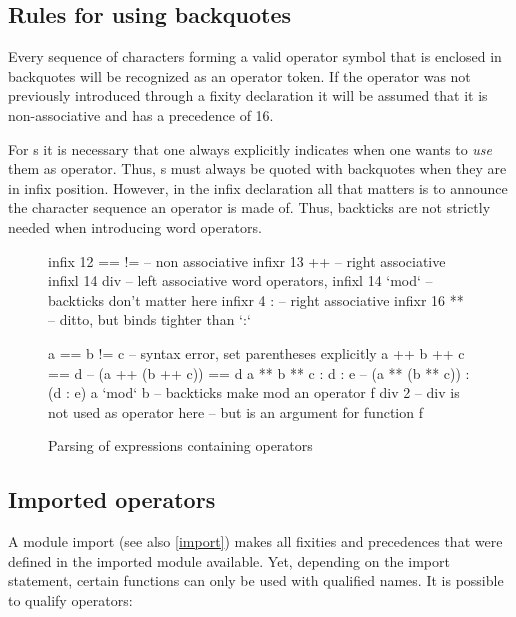 \subsection{Rules for using backquotes}

Every sequence of characters forming a valid operator symbol that is enclosed in backquotes will be recognized as an operator token. If the operator was not previously introduced through a fixity declaration it will be assumed that it is non-associative and has a precedence of 16.


For s it is necessary that one always explicitly indicates when one wants to \textit{use} them as operator. Thus, s must always be quoted with backquotes when they are in infix position. However, in the infix declaration all that matters is to announce the character sequence an operator is made of. Thus, backticks are not strictly needed when introducing word operators.

\begin{figure}

\begin{code}

infix 12 == !=           -- non associative
infixr 13 ++             -- right associative
infixl 14 div            -- left associative word operators, 
infixl 14 `mod`          -- backticks don't matter here
infixr 4 :               -- right associative
infixr 16 **             -- ditto, but binds tighter than `:`

a == b != c              -- syntax error, set parentheses explicitly
a ++ b ++ c  == d        -- (a ++ (b ++ c)) == d
a ** b ** c : d : e      -- (a ** (b ** c)) : (d : e)
a `mod` b                -- backticks make mod an operator
f div 2                  -- div is not used as operator here
                         -- but is an argument for function f
\end{code}

\caption{Parsing of expressions containing operators} \label{exprparse}
\end{figure}

\subsection{Imported operators} \label{importedops}

A module import (see also \autoref{import}) makes all fixities and precedences that were defined in the imported module available. Yet, depending on the import statement, certain functions can only be used with qualified names. It is possible to qualify operators:

